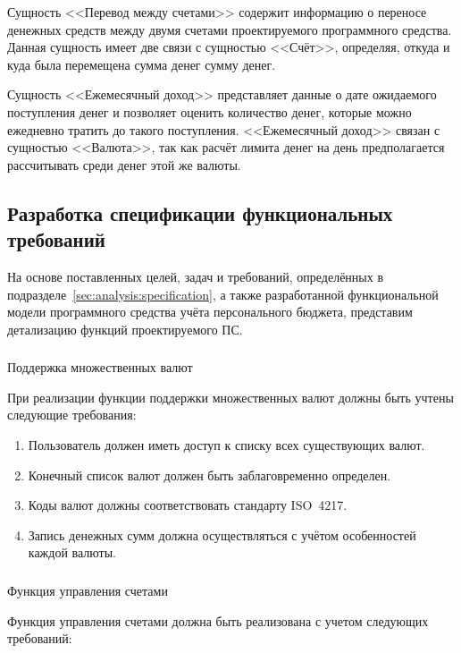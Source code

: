 Сущность <<Перевод между счетами>> содержит информацию о переносе денежных средств между двумя счетами проектируемого программного средства.
Данная сущность имеет две связи с сущностью <<Счёт>>, определяя, откуда и куда была перемещена сумма денег сумму денег.

Сущность <<Ежемесячный доход>> представляет данные о дате ожидаемого поступления денег и позволяет оценить количество денег, которые можно ежедневно тратить до такого поступления.
<<Ежемесячный доход>> связан с сущностью <<Валюта>>, так как расчёт лимита денег на день предполагается рассчитывать среди денег этой же валюты.

\subsection{Разработка спецификации функциональных требований}
\label{sec:domain:specification}

На основе поставленных целей, задач и требований, определённых в подразделе~\ref{sec:analysis:specification}, а также разработанной функциональной модели программного средства учёта персонального бюджета, представим детализацию функций проектируемого ПС.

\subsubsection{} Поддержка множественных валют
\label{sec:domain:specification:currencies}

При реализации функции поддержки множественных валют должны быть учтены следующие требования:

\begin{enumerate}
    \item Пользователь должен иметь доступ к списку всех существующих валют.
    \item Конечный список валют должен быть заблаговременно определен.
    \item Коды валют должны соответствовать стандарту ISO~4217.
    \item Запись денежных сумм должна осуществляться с учётом особенностей каждой валюты.
\end{enumerate}


\subsubsection{} Функция управления счетами
\label{sec:domain:specification:wallets}

Функция управления счетами должна быть реализована с учетом следующих требований:

